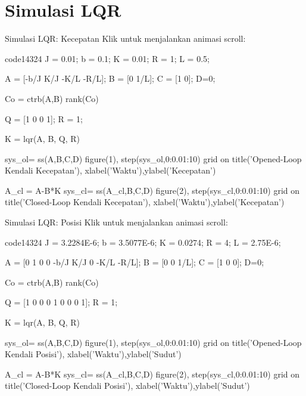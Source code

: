 \documentclass[10pt,xcolor={dvipsnames}]{beamer}
\begin{document}
\section{Simulasi LQR}
\begin{frame}[t,fragile]{Simulasi LQR: Kecepatan}
	Klik untuk menjalankan animasi scroll:
	\begin{codescroll}[style=C++]{code1}{43}{24}
		J = 0.01;
		b = 0.1;
		K = 0.01;
		R = 1;
		L = 0.5;
		
		
		A = [-b/J    K/J
		-K/L    -R/L];
		B = [0
		1/L];
		C = [1  0];
		D=0;
		
		Co = ctrb(A,B)
		rank(Co)
		
		Q = [1    0
		0    1];
		R = 1;
		
		K = lqr(A, B, Q, R)
		
		sys_ol= ss(A,B,C,D)
		figure(1), step(sys_ol,0:0.01:10)
		grid on
		title('Opened-Loop Kendali Kecepatan'), xlabel('Waktu'),ylabel('Kecepatan')
		
		A_cl = A-B*K   
		sys_cl= ss(A_cl,B,C,D)
		figure(2), step(sys_cl,0:0.01:10)
		grid on
		title('Closed-Loop Kendali Kecepatan'), xlabel('Waktu'),ylabel('Kecepatan')
	\end{codescroll}
\end{frame}

\begin{frame}[t,fragile]{Simulasi LQR: Posisi}
	Klik untuk menjalankan animasi scroll:
	\begin{codescroll}[style=C++]{code1}{43}{24}
		J = 3.2284E-6;
		b = 3.5077E-6;
		K = 0.0274;
		R = 4;
		L = 2.75E-6;
		
		
		A = [0  1       0
		0  -b/J    K/J
		0  -K/L    -R/L];
		B = [0
		0
		1/L];
		C = [1  0   0];
		D=0;
		
		Co = ctrb(A,B)
		rank(Co)
		
		Q = [1    0    0
		0    1    0
		0    0    1];
		R = 1;
		
		K = lqr(A, B, Q, R)
		
		sys_ol= ss(A,B,C,D)
		figure(1), step(sys_ol,0:0.01:10)
		grid on
		title('Opened-Loop Kendali Posisi'), xlabel('Waktu'),ylabel('Sudut')
		
		A_cl = A-B*K   
		sys_cl= ss(A_cl,B,C,D)
		figure(2), step(sys_cl,0:0.01:10)
		grid on
		title('Closed-Loop Kendali Posisi'), xlabel('Waktu'),ylabel('Sudut')
	\end{codescroll}
\end{frame}
\end{document}
